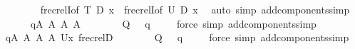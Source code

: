 \begin{isabellebody}
\ \ \ \ \ \ \ \ \isamarkupfalse%
\ frecrelI{\isacharbrackleft}{\kern0pt}of\ {\isacharquery}{\kern0pt}T\ {\isacharquery}{\kern0pt}D\ x{\isacharbrackright}{\kern0pt}\ \ frecrelI{\isacharbrackleft}{\kern0pt}of\ {\isacharquery}{\kern0pt}U\ {\isacharquery}{\kern0pt}D\ x{\isacharbrackright}{\kern0pt}\ \isamarkupfalse%
\ {\isacharparenleft}{\kern0pt}auto\ simp\ add{\isacharcolon}{\kern0pt}components{\isacharunderscore}{\kern0pt}simp{\isacharparenright}{\kern0pt}\isanewline
\ \ \ \ \ \ \isamarkupfalse%
\ {\isacartoucheopen}q{\isasymin}A{}{\isacartoucheclose}\ {\isacartoucheopen}{\isasymsigma}{\isasymin}A{}{\isacartoucheclose}\ {\isacartoucheopen}{\isacharquery}{\kern0pt}{\isasymtau}{\isasymin}A{}{\isacartoucheclose}\ {\isacartoucheopen}{\isacharquery}{\kern0pt}{\isasymtheta}{\isasymin}A{}{\isacartoucheclose}\isanewline
\ \ \ \ \ \ \isamarkupfalse%
\ {\isachardoublequoteopen}Q{\isacharparenleft}{\kern0pt}{}{\isacharcomma}{\kern0pt}\ {\isasymsigma}{\isacharcomma}{\kern0pt}\ {\isacharquery}{\kern0pt}{\isasymtau}{\isacharcomma}{\kern0pt}\ q{\isacharparenright}{\kern0pt}{\isachardoublequoteclose}\ \isamarkupfalse%
\ {}\ \isamarkupfalse%
\ {\isacharparenleft}{\kern0pt}force\ simp\ add{\isacharcolon}{\kern0pt}components{\isacharunderscore}{\kern0pt}simp{\isacharparenright}{\kern0pt}\isanewline
\ \ \ \ \ \ \isamarkupfalse%
\ \isamarkupfalse%
\ {\isacartoucheopen}q{\isasymin}A{}{\isacartoucheclose}\ {\isacartoucheopen}{\isasymsigma}{\isasymin}A{}{\isacartoucheclose}\ {\isacartoucheopen}{\isacharquery}{\kern0pt}{\isasymtau}{\isasymin}A{}{\isacartoucheclose}\ {\isacartoucheopen}{\isacharquery}{\kern0pt}{\isasymtheta}{\isasymin}A{}{\isacartoucheclose}\ {\isacartoucheopen}{\isasymlangle}{\isacharquery}{\kern0pt}U{\isacharcomma}{\kern0pt}x{\isasymrangle}{\isasymin}\ frecrel{\isacharparenleft}{\kern0pt}{\isacharquery}{\kern0pt}D{\isacharparenright}{\kern0pt}{\isacartoucheclose}\isanewline
\ \ \ \ \ \ \isamarkupfalse%
\ {\isachardoublequoteopen}Q{\isacharparenleft}{\kern0pt}{}{\isacharcomma}{\kern0pt}\ {\isasymsigma}{\isacharcomma}{\kern0pt}\ {\isacharquery}{\kern0pt}{\isasymtheta}{\isacharcomma}{\kern0pt}\ q{\isacharparenright}{\kern0pt}{\isachardoublequoteclose}\ \isamarkupfalse%
\ {}\ \isamarkupfalse%
\ {\isacharparenleft}{\kern0pt}force\ simp\ add{\isacharcolon}{\kern0pt}components{\isacharunderscore}{\kern0pt}simp{\isacharparenright}{\kern0pt}\isanewline

\end{isabellebody}
